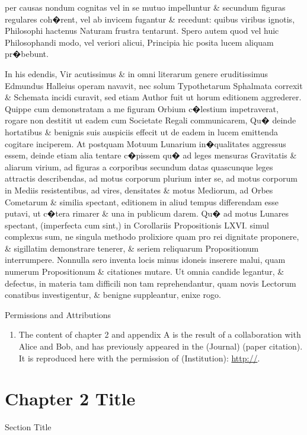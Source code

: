 \documentclass[oneside,12pt,final]{sty/ucthesis-CA2012}
\begin{document}
\begin{mainmatter}
per causas nondum cognitas vel in se mutuo impelluntur \& secundum figuras regulares coh�rent, vel ab invicem fugantur \& recedunt: quibus viribus ignotis, Philosophi hactenus Naturam frustra tentarunt. Spero autem quod vel huic Philosophandi modo, vel veriori alicui, Principia hic posita lucem aliquam pr�bebunt.

In his edendis, Vir acutissimus \& in omni literarum genere eruditissimus Edmundus Halleius operam navavit, nec solum Typothetarum Sphalmata correxit \& Schemata incidi curavit, sed etiam Author fuit ut horum editionem aggrederer. Quippe cum demonstratam a me figuram Orbium c�lestium impetraverat, rogare non destitit ut eadem cum Societate Regali communicarem, Qu� deinde hortatibus \& benignis suis auspiciis effecit ut de eadem in lucem emittenda cogitare inciperem. At postquam Motuum Lunarium in�qualitates aggressus essem, deinde etiam alia tentare c�pissem qu� ad leges mensuras Gravitatis \& aliarum virium, ad figuras a corporibus secundum datas quascunque leges attractis describendas, ad motus corporum plurium inter se, ad motus corporum in Mediis resistentibus, ad vires, densitates \& motus Mediorum, ad Orbes Cometarum \& similia spectant, editionem in aliud tempus differendam esse putavi, ut c�tera rimarer \& una in publicum darem. Qu� ad motus Lunares spectant, (imperfecta cum sint,) in Corollariis Propositionis LXVI. simul complexus sum, ne singula methodo prolixiore quam pro rei dignitate proponere, \& sigillatim demonstrare tenerer, \& seriem reliquarum Propositionum interrumpere. Nonnulla sero inventa locis minus idoneis inserere malui, quam numerum Propositionum \& citationes mutare. Ut omnia candide legantur, \& defectus, in materia tam difficili non tam reprehendantur, quam novis Lectorum conatibus investigentur, \& benigne suppleantur, enixe rogo.


\begin{section}{Permissions and Attributions}
\begin{enumerate}

\item The content of chapter 2 and appendix A is the result of a collaboration with Alice and Bob, and has previously appeared in the (Journal) (paper citation). It is reproduced here with the permission of (Institution): \url{http://}.

\end{enumerate}
\end{section}

\chapter{Chapter 2 Title}
\begin{section}{Section Title}


\end{section}
\end{mainmatter}
\end{document}
